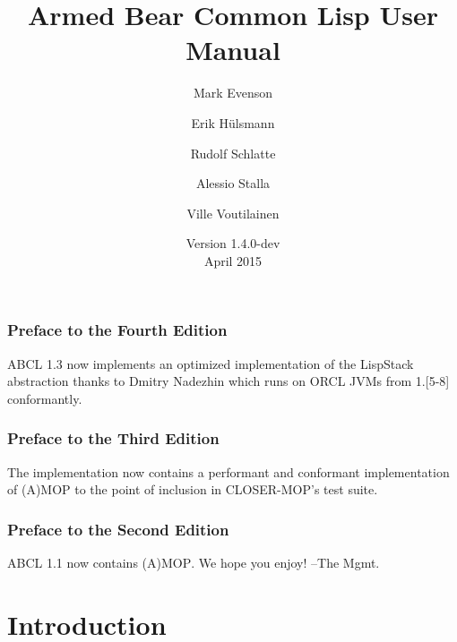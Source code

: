 \documentclass[10pt]{book}
\begin{document}
\title{Armed Bear Common Lisp User Manual}
\date{Version 1.4.0-dev\\
\smallskip
April 2015}
\author{Mark Evenson \and Erik H\"{u}lsmann \and Rudolf Schlatte \and
  Alessio Stalla \and Ville Voutilainen}

\maketitle

\tableofcontents
\subsection{Preface to the Fourth Edition}

\textsc{ABCL} 1.3 now implements an optimized implementation of the
LispStack abstraction thanks to Dmitry Nadezhin which runs on ORCL
JVMs from 1.[5-8] conformantly.

\subsection{Preface to the Third Edition}
The implementation now contains a performant and conformant
implementation of (A)MOP to the point of inclusion in CLOSER-MOP's
test suite.


\subsection{Preface to the Second Edition}

\textsc{ABCL} 1.1 now contains \textsc{(A)MOP}.  We hope you enjoy!  --The Mgmt.

\chapter{Introduction}
\end{document}
